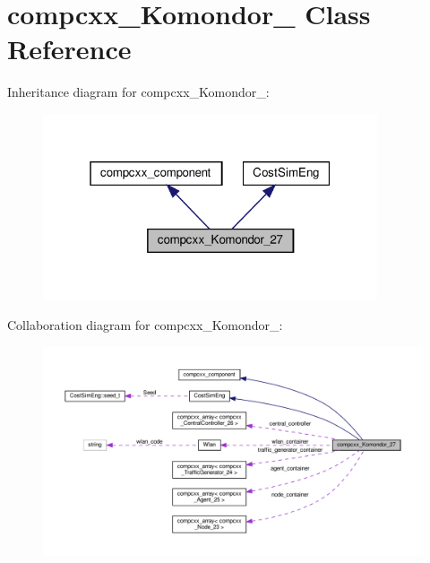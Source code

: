 \hypertarget{classcompcxx__Komondor__27}{}\section{compcxx\+\_\+\+Komondor\+\_ Class Reference}
\label{classcompcxx__Komondor__27}


Inheritance diagram for compcxx\+\_\+\+Komondor\+\_\+:\nopagebreak
\begin{figure}[H]
\begin{center}
\leavevmode
\includegraphics[width=280pt]{classcompcxx__Komondor__27__inherit__graph}
\end{center}
\end{figure}


Collaboration diagram for compcxx\+\_\+\+Komondor\+\_\+:\nopagebreak
\begin{figure}[H]
\begin{center}
\leavevmode
\includegraphics[width=350pt]{classcompcxx__Komondor__27__coll__graph}
\end{center}
\end{figure}
